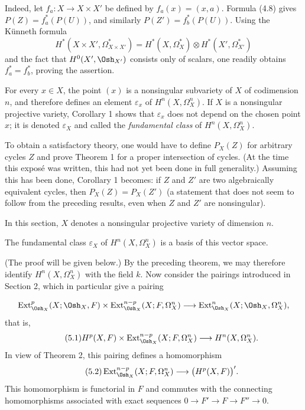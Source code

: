 Indeed, let $f_a:X\longrightarrow X\times X'$ be defined by
$f_a(x)=(x,a)$. Formula (4.8) gives $P(Z)=f_a^{*}(P(U))$, and similarly
$P(Z')=f_b^{*}(P(U))$. Using the Künneth formula
\[
  H^{*}(X\times X',\Omega_{X\times X'}^{*})
  =H^{*}(X,\Omega_X^{*})\otimes H^{*}(X',\Omega_{X'}^{*})
\]
and the fact that $H^{0}(X',\Osh_{X'})$ consists only of scalars, one readily
obtains $f_a^{*}=f_b^{*}$, proving the assertion.

For every $x\in X$, the point $(x)$ is a nonsingular subvariety of $X$ of
codimension $n$, and therefore defines an element $\varepsilon_x$ of
$H^{n}(X,\Omega_X^{n})$. If $X$ is a nonsingular projective variety, Corollary 1
shows that $\varepsilon_x$ does not depend on the chosen point $x$; it is denoted
$\varepsilon_X$ and called the \emph{fundamental class} of
$H^{n}(X,\Omega_X^{n})$.

 To obtain a satisfactory theory, one would have to define
$P_X(Z)$ for arbitrary cycles $Z$ and prove Theorem 1 for a proper intersection
of cycles. (At the time this exposé was written, this had not yet been done in
full generality.) Assuming this has been done, Corollary 1 becomes: if $Z$ and
$Z'$ are two algebraically equivalent cycles, then $P_X(Z)=P_X(Z')$ (a statement
that does not seem to follow from the preceding results, even when $Z$ and $Z'$
are nonsingular).


In this section, $X$ denotes a nonsingular projective variety of dimension $n$.

 The fundamental class $\varepsilon_X$ of
$H^{n}(X,\Omega_X^{n})$ is a basis of this vector space.

(The proof will be given below.) By the preceding theorem, we may therefore
identify $H^{n}(X,\Omega_X^{n})$ with the field $k$. Now consider the pairings
introduced in Section 2, which in particular give a pairing

\[
\operatorname{Ext}_{\Osh_X}^{p}(X;\Osh_X,F)
\times\operatorname{Ext}_{\Osh_X}^{n-p}(X;F,\Omega_X^{n})
\longrightarrow
\operatorname{Ext}_{\Osh_X}^{n}(X;\Osh_X,\Omega_X^{n}),
\]
that is,
\begin{equation}\tag{5.1}
  H^{p}(X,F)
  \times\operatorname{Ext}_{\Osh_X}^{n-p}(X;F,\Omega_X^{n})
  \longrightarrow H^{n}(X,\Omega_X^{n}).
\end{equation}
In view of Theorem 2, this pairing defines a homomorphism
\begin{equation}\tag{5.2}
  \operatorname{Ext}_{\Osh_X}^{n-p}(X;F,\Omega_X^{n})
  \longrightarrow\bigl(H^{p}(X,F)\bigr)'.
\end{equation}
This homomorphism is functorial in $F$ and commutes with the connecting
homomorphisms associated with exact sequences
$0\longrightarrow F'\longrightarrow F\longrightarrow F''\longrightarrow0$.


